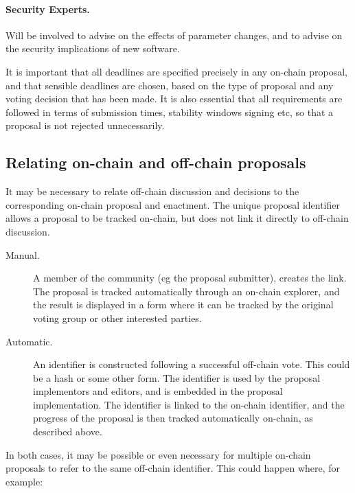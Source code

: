 \paragraph{Security Experts.} Will be involved to advise on the effects of parameter changes, and to advise on the security implications of new software.

It is important that all deadlines are specified precisely in any on-chain proposal, and that sensible deadlines are chosen, based on the type of proposal and any
voting decision that has been made.  It is also essential that all requirements are followed in terms of submission times, stability windows signing etc, so that a proposal is not
rejected unnecessarily.


\subsection{Relating on-chain and off-chain proposals}
\label{sect:relating-off-and-on-chain}

It may be necessary to relate off-chain discussion and decisions to the corresponding on-chain proposal and enactment.  The unique proposal
identifier allows a proposal to be tracked on-chain, but does not link it directly to off-chain discussion.

\begin{description}
\item [Manual.]
  A member of the community (eg the proposal submitter), creates the link.  The proposal is tracked automatically through an on-chain explorer, and the result is
  displayed in a form where it can be tracked by the original voting group or other interested parties.
\item [Automatic.]
  An identifier is constructed following a successful off-chain vote.  This could be a hash or some other form.  The identifier is used by the proposal implementors and editors, and is embedded
  in the proposal implementation.  The identifier is linked to the on-chain identifier, and the progress of the proposal is then tracked automatically on-chain, as described above.
\end{description}

In both cases, it may be possible or even necessary for multiple on-chain proposals to refer to the same off-chain identifier.  This could happen where, for example:

